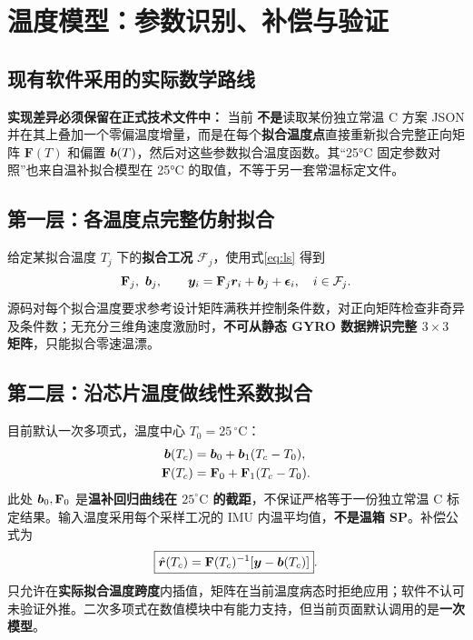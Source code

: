 \chapter{温度模型：参数识别、补偿与验证}
\section{现有软件采用的实际数学路线}
\begin{warningbox}
\textbf{实现差异必须保留在正式技术文件中：} 当前 \textbf{不是}读取某份独立常温 C 方案 JSON 并在其上叠加一个零偏温度增量，而是在每个\textbf{拟合温度点}直接重新拟合完整正向矩阵 $\mathbf F(T)$ 和偏置 $\bm{b}(T)$，然后对这些参数拟合温度函数。其“25°C 固定参数对照”也来自温补拟合模型在 25°C 的取值，不等于另一套常温标定文件。
\end{warningbox}
\section{第一层：各温度点完整仿射拟合}
给定某拟合温度 $T_j$ 下的\textbf{拟合工况} $\mathcal F_j$，使用式\eqref{eq:ls} 得到
\begin{equation}
\mathbf F_j,\ \bm{b}_j,
\qquad \bm{y}_i=\mathbf F_j\bm{r}_i+\bm{b}_j+\bm{\epsilon}_i,
\quad i\in\mathcal F_j.
\end{equation}
源码对每个拟合温度要求参考设计矩阵满秩并控制条件数，对正向矩阵检查非奇异及条件数；无充分三维角速度激励时，\textbf{不可从静态 GYRO 数据辨识完整 $3\times3$ 矩阵}，只能拟合零速温漂。

\section{第二层：沿芯片温度做线性系数拟合}
目前默认一次多项式，温度中心 $T_0=25\, ^\circ\mathrm C$：
\begin{align}
\bm{b}(T_c)&=\bm{b}_0+\bm{b}_1(T_c-T_0),\\
\mathbf F(T_c)&=\mathbf F_0+\mathbf F_1(T_c-T_0).
\end{align}
此处 $\bm{b}_0,\mathbf F_0$ 是\textbf{温补回归曲线在 $25^\circ\mathrm C$ 的截距}，不保证严格等于一份独立常温 C 标定结果。输入温度采用每个采样工况的 IMU 内温平均值，\textbf{不是温箱 SP}。补偿公式为
\begin{equation}\label{eq:thermal_apply}
\boxed{\hat{\bm{r}}(T_c)=\mathbf F(T_c)^{-1}[\bm{y}-\bm{b}(T_c)]}.
\end{equation}
只允许在\textbf{实际拟合温度跨度}内插值，矩阵在当前温度病态时拒绝应用；软件不认可未验证外推。二次多项式在数值模块中有能力支持，但当前页面默认调用的是\textbf{一次模型}。

